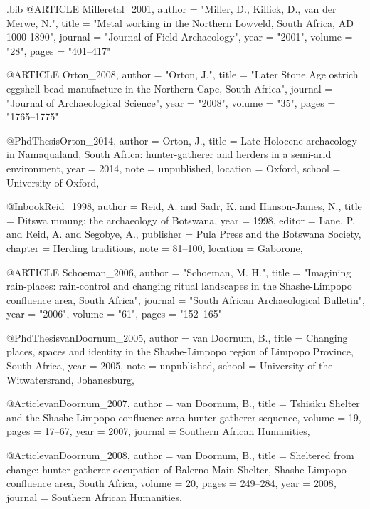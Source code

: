 \begin{filecontents}{\IJSRAidentifier.bib}
@ARTICLE {Milleretal_2001,
author  = "Miller, D., Killick, D., van der Merwe, N.",
title   = "Metal working in the Northern Lowveld, South Africa, AD 1000-1890",
journal = "Journal of Field Archaeology",
year    = "2001",
volume  = "28",
pages   = "401--417"
}


@ARTICLE {Orton_2008,
author  = "Orton, J.",
title   = "Later Stone Age ostrich eggshell bead manufacture in the Northern Cape, South Africa",
journal = "Journal of Archaeological Science",
year    = "2008",
volume  = "35",
pages   = "1765--1775"
}

@PhdThesis{Orton_2014,
  author   = {Orton, J.},
  title    = {Late Holocene archaeology in Namaqualand, South Africa: hunter-gatherer and herders in a semi-arid environment},
  year     = {2014},
  note     = {unpublished},
  location = {Oxford},
  school   = {University of Oxford},
}

@Inbook{Reid_1998,
  author    = {Reid, A. and Sadr, K. and Hanson-James, N.},
  title     = {Ditswa mmung: the archaeology of Botswana},
  year      = {1998},
  editor    = {Lane, P. and Reid, A. and Segobye, A.},
  publisher = {Pula Press and the Botswana Society},
  chapter   = {Herding traditions},
  note      = {81--100},
  location  = {Gaborone},
}


@ARTICLE {Schoeman_2006,
author  = "Schoeman, M. H.",
title   = "Imagining rain-places: rain-control and changing ritual landscapes in the Shashe-Limpopo confluence area, South Africa",
journal = "South African Archaeological Bulletin",
year    = "2006",
volume  = "61",
pages   = "152--165"
}

@PhdThesis{vanDoornum_2005,
  author = {{van Doornum}, B.},
  title  = {Changing places, spaces and identity in the Shashe-Limpopo region of Limpopo Province, South Africa},
  year   = {2005},
  note   = {unpublished},
  school = {University of the Witwatersrand, Johanesburg},
}

@Article{vanDoornum_2007,
  author  = {{van Doornum}, B.},
  title   = {Tshisiku Shelter and the Shashe-Limpopo confluence area hunter-gatherer sequence},
  volume  = {19},
  pages   = {17--67},
  year    = {2007},
  journal = {Southern African Humanities},
}

@Article{vanDoornum_2008,
  author  = {{van Doornum}, B.},
  title   = {Sheltered from change: hunter-gatherer occupation of Balerno Main Shelter, Shashe-Limpopo confluence area, South Africa},
  volume  = {20},
  pages   = {249--284},
  year    = {2008},
  journal = {Southern African Humanities},
}


\end{filecontents}
